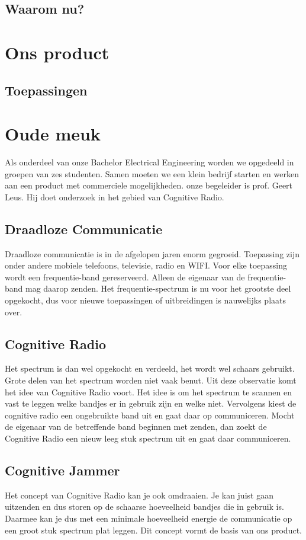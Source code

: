 \documentclass[oneside, a4paper, openany]{article}
\begin{document}
\subsection{Waarom nu?}


\section{Ons product}
\subsection{Toepassingen}


\clearpage
\section{Oude meuk}
Als onderdeel van onze Bachelor Electrical Engineering worden we opgedeeld in groepen van zes studenten. Samen moeten we een klein bedrijf starten en werken aan een product met commerciele mogelijkheden. onze begeleider is prof. Geert Leus. Hij doet onderzoek in het gebied van Cognitive Radio.

\subsection{Draadloze Communicatie}
Draadloze communicatie is in de afgelopen jaren enorm gegroeid. Toepassing zijn onder andere mobiele telefoons, televisie, radio en WIFI. Voor elke toepassing wordt een frequentie-band gereserveerd. Alleen de eigenaar van de frequentie-band mag daarop zenden. Het frequentie-spectrum is nu voor het grootste deel opgekocht, dus voor nieuwe toepassingen of uitbreidingen is nauwelijks plaats over.

\subsection{Cognitive Radio}
Het spectrum is dan wel opgekocht en verdeeld, het wordt wel schaars gebruikt. Grote delen van het spectrum worden niet vaak benut. Uit deze observatie komt het idee van Cognitive Radio voort. Het idee is om het spectrum te scannen en vast te leggen welke bandjes er in gebruik zijn en welke niet. Vervolgens kiest de cognitive radio een ongebruikte band uit en gaat daar op communiceren. Mocht de eigenaar van de betreffende band beginnen met zenden, dan zoekt de Cognitive Radio een nieuw leeg stuk spectrum uit en gaat daar communiceren.

\subsection{Cognitive Jammer}
Het concept van Cognitive Radio kan je ook omdraaien. Je kan juist gaan uitzenden en dus storen op de schaarse hoeveelheid bandjes die in gebruik is. Daarmee kan je dus met een minimale hoeveelheid energie de communicatie op een groot stuk spectrum plat leggen. Dit concept vormt de basis van ons product.
\end{document}
